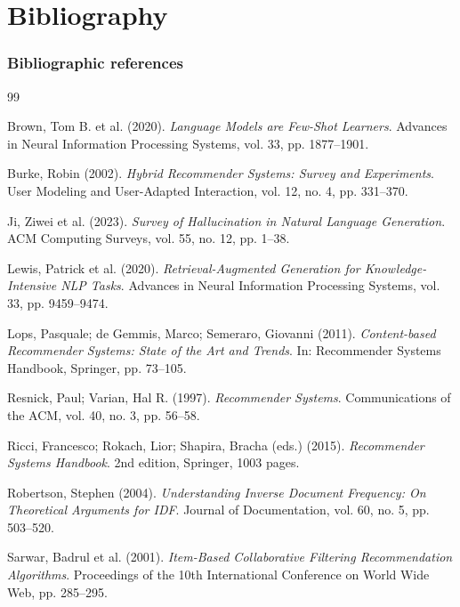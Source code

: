 ﻿%
\clearpage
{}
{}
\chapter*{Bibliography}

\subsection*{Bibliographic references}

\begin{thebibliography}{99}

Brown, Tom B. et al. (2020).
\textit{Language Models are Few-Shot Learners}.
Advances in Neural Information Processing Systems, vol. 33, pp. 1877--1901.

Burke, Robin (2002).
\textit{Hybrid Recommender Systems: Survey and Experiments}.
User Modeling and User-Adapted Interaction, vol. 12, no. 4, pp. 331--370.

Ji, Ziwei et al. (2023).
\textit{Survey of Hallucination in Natural Language Generation}.
ACM Computing Surveys, vol. 55, no. 12, pp. 1--38.

Lewis, Patrick et al. (2020).
\textit{Retrieval-Augmented Generation for Knowledge-Intensive NLP Tasks}.
Advances in Neural Information Processing Systems, vol. 33, pp. 9459--9474.

Lops, Pasquale; de Gemmis, Marco; Semeraro, Giovanni (2011).
\textit{Content-based Recommender Systems: State of the Art and Trends}.
In: Recommender Systems Handbook, Springer, pp. 73--105.

Resnick, Paul; Varian, Hal R. (1997).
\textit{Recommender Systems}.
Communications of the ACM, vol. 40, no. 3, pp. 56--58.

Ricci, Francesco; Rokach, Lior; Shapira, Bracha (eds.) (2015).
\textit{Recommender Systems Handbook}.
2nd edition, Springer, 1003 pages.

Robertson, Stephen (2004).
\textit{Understanding Inverse Document Frequency: On Theoretical Arguments for
IDF}.
Journal of Documentation, vol. 60, no. 5, pp. 503--520.

Sarwar, Badrul et al. (2001).
\textit{Item-Based Collaborative Filtering Recommendation Algorithms}.
Proceedings of the 10th International Conference on World Wide Web,
pp. 285--295.


\end{thebibliography}
